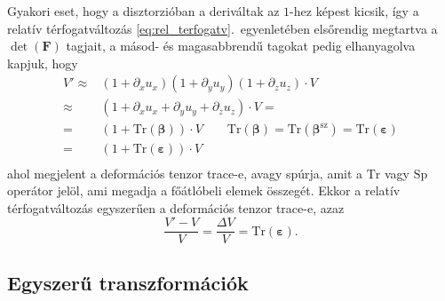 \documentclass[12pt,a4paper]{scrartcl}
\let\mathbf\bm
\begin{document}
Gyakori eset, hogy a disztorzióban a deriváltak az $1$-hez képest kicsik, így a relatív térfogatváltozás \ref{eq:rel_terfogatv}.\ egyenletében elsőrendig megtartva a $\det \left( {\mathbf{F}} \right)$ tagjait, a másod- és magasabbrendű tagokat pedig elhanyagolva kapjuk, hogy 
\[\begin{aligned}
  V' \approx  & \left( {1 + {\partial _x}{u_x}} \right)\left( {1 + {\partial _y}{u_y}} \right)\left( {1 + {\partial _z}{u_z}} \right) \cdot V \\ 
   \approx  & \left( {1 + {\partial _x}{u_x} + {\partial _y}{u_y} + {\partial _z}{u_z}} \right) \cdot V =  \\ 
   =  & \left( {1 + {\text{Tr}}\left( {\mathbf{\beta }} \right)} \right) \cdot V\quad \quad {\text{Tr}}\left( {\mathbf{\beta }} \right) = {\text{Tr}}\left( {{{\mathbf{\beta }}^{{\text{sz}}}}} \right) = {\text{Tr}}\left( {{{\mathbf{\varepsilon }}}} \right) \\ 
   =  & \left( {1 + {\text{Tr}}\left( {{\mathbf{\varepsilon }}} \right)} \right) \cdot V \\ 
\end{aligned} \]
ahol megjelent a deformációs tenzor trace-e, avagy spúrja, amit a ${\text {Tr}}$ vagy ${\text {Sp}}$ operátor jelöl, ami megadja a főátlóbeli elemek összegét. Ekkor a relatív térfogatváltozás egyszerűen a deformációs tenzor trace-e, azaz
\[\frac{{V' - V}}{V} = \frac{{\Delta V}}{V} = {\text{Tr}}\left( {\mathbf{\varepsilon }} \right).\]

\subsection{Egyszerű transzformációk}
\end{document}
